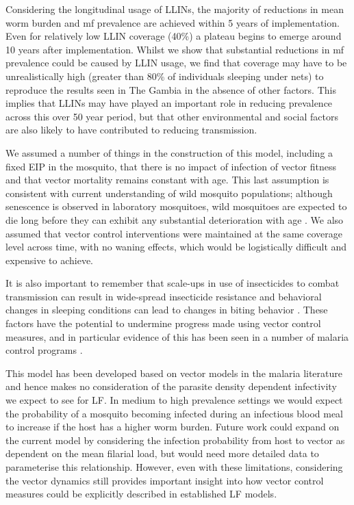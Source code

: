 Considering the longitudinal usage of LLINs, the majority of reductions in mean worm burden and mf prevalence are achieved within 5 years of implementation. Even for relatively low LLIN coverage (40\%) a plateau begins to emerge around 10 years after implementation. Whilst we show that substantial reductions in mf prevalence could be caused by LLIN usage, we find that coverage may have to be unrealistically high (greater than 80\% of individuals sleeping under nets) to reproduce the results seen in The Gambia in the absence of other factors. This implies that LLINs may have played an important role in reducing prevalence across this over 50 year period, but that other environmental and social factors are also likely to have contributed to reducing transmission.

We assumed a number of things in the construction of this model, including a fixed EIP in the mosquito, that there is no impact of infection of vector fitness and that vector mortality remains constant with age. This last assumption is consistent with current understanding of wild mosquito populations; although senescence is observed in laboratory mosquitoes, wild mosquitoes are expected to die long before they can exhibit any substantial deterioration with age \cite{Ryan2015}. We also assumed that vector control interventions were maintained at the same coverage level across time, with no waning effects, which would be logistically difficult and expensive to achieve.

It is also important to remember that scale-ups in use of insecticides to combat transmission can result in wide-spread insecticide resistance and behavioral changes in sleeping conditions can lead to changes in biting behavior \cite{Fornadel2010,Weill2003}. These factors have the potential to undermine progress made using vector control measures, and in particular evidence of this has been seen in a number of malaria control programs \cite{Ranson2016,Hemingway2016,Toe2014}.

This model has been developed based on vector models in the malaria literature and hence makes no consideration of the parasite density dependent infectivity we expect to see for LF. In medium to high prevalence settings we would expect the probability of a mosquito becoming infected during an infectious blood meal to increase if the host has a higher worm burden. Future work could expand on the current model by considering the infection probability from host to vector as dependent on the mean filarial load, but would need more detailed data to parameterise this relationship. However, even with these limitations, considering the vector dynamics still provides important insight into how vector control measures could be explicitly described in established LF models.

